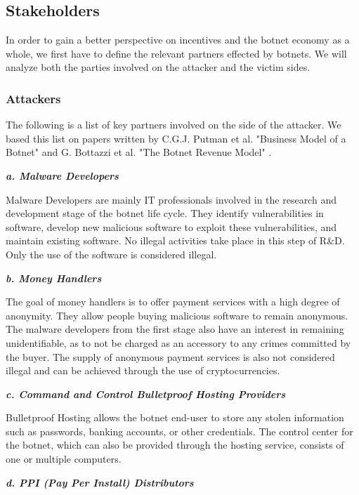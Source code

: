 	\subsection{Stakeholders}
			In order to gain a better perspective on incentives and the botnet economy as a whole, we first have to define the relevant partners effected by botnets. We will analyze both the parties involved on the attacker and the victim sides.
			
		\subsubsection{Attackers}

			The following is a list of key partners involved on the side of the attacker. We based this list on papers written by C.G.J. Putman et al. "Business Model of a Botnet" and G. Bottazzi et al. "The Botnet Revenue Model" \cite{Putman,Bottazzi14}.

			\textbf{\textit{a. Malware Developers}}
			
			Malware Developers are mainly IT professionals involved in the research and development stage of the botnet life cycle. They identify vulnerabilities in software, develop new malicious software to exploit these vulnerabilities, and maintain existing software. No illegal activities take place in this step of R\&D. Only the use of the software is considered illegal. \cite{Putman,Bottazzi14}

			\textbf{\textit{b. Money Handlers}}
			
			The goal of money handlers is to offer payment services with a high degree of anonymity. They allow people buying malicious software to remain anonymous. The malware developers from the first stage also have an interest in remaining unidentifiable, as to not be charged as an accessory to any crimes committed by the buyer. The supply of anonymous payment services is also not considered illegal and can be achieved through the use of cryptocurrencies. \cite{Putman,Bottazzi14}

			\textbf{\textit{c. Command and Control Bulletproof Hosting Providers}}
			
			Bulletproof Hosting allows the botnet end-user to store any stolen information such as passwords, banking accounts, or other credentials. The control center for the botnet, which can also be provided through the hosting service, consists of one or multiple computers. \cite{Putman,Bottazzi14}

			\textbf{\textit{d. PPI (Pay Per Install) Distributors}}
			

